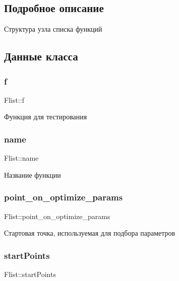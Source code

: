 \subsection{Подробное описание}
Структура узла списка функций 

\subsection{Данные класса}
\mbox{\label{structFlist_a296174c97f684b938d00d3eeeac18c36}} 
\subsubsection{\texorpdfstring{f}{f}}
{\footnotesize\ttfamily Flist\+::f}

Функция для тестирования \mbox{\label{structFlist_a54568e8e2278ecf5c53668a00b9aedc3}} 
\subsubsection{\texorpdfstring{name}{name}}
{\footnotesize\ttfamily Flist\+::name}

Название функции \mbox{\label{structFlist_a781e14b6b3d9b4f0c0c0e23fad2ab45e}} 
\subsubsection{\texorpdfstring{point\+\_\+on\+\_\+optimize\+\_\+params}{point\_on\_optimize\_params}}
{\footnotesize\ttfamily Flist\+::point\+\_\+on\+\_\+optimize\+\_\+params}

Стартовая точка, используемая для подбора параметров \mbox{\label{structFlist_a2613ea577e8ae831bc9778276d7cf866}} 
\subsubsection{\texorpdfstring{start\+Points}{startPoints}}
{\footnotesize\ttfamily Flist\+::start\+Points}

